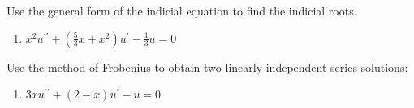 \begin{fullwidth}
\noindent Use the general form of the indicial equation to find the indicial roots.

\begin{enumerate}[resume]
\item $x^2u^{\prime \prime} + \left(\frac{5}{3}x+x^2 \right)u^{\prime}-\frac{1}{3}u = 0$
\end{enumerate}

\vspace{1.0cm}

\noindent Use the method of Frobenius to obtain two linearly independent series solutions:
\begin{enumerate}[resume]
\item $3xu^{\prime \prime} + (2-x)u^{\prime} - u = 0$
\end{enumerate}

\end{fullwidth}
